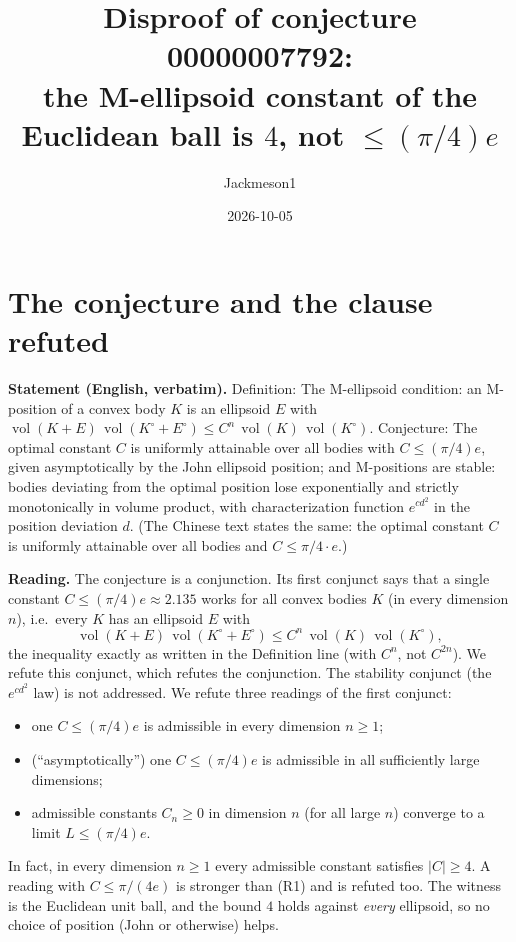 \documentclass[11pt]{article}
\title{Disproof of conjecture 00000007792:\\ the M-ellipsoid constant of the Euclidean ball is $4$, not $\le (\pi/4)e$}
\author{Jackmeson1}
\date{2026-10-05}
\theoremstyle{definition}
\newcommand{\vol}{\operatorname{vol}}
\begin{document}
\maketitle

\section{The conjecture and the clause refuted}

\textbf{Statement (English, verbatim).} Definition: The M-ellipsoid condition: an M-position of a
convex body $K$ is an ellipsoid $E$ with
$\vol(K+E)\,\vol(K^\circ+E^\circ)\le C^n\,\vol(K)\,\vol(K^\circ)$. Conjecture: The optimal constant
$C$ is uniformly attainable over all bodies with $C\le(\pi/4)e$, given asymptotically by the John
ellipsoid position; and M-positions are stable: bodies deviating from the optimal position lose
exponentially and strictly monotonically in volume product, with characterization function
$e^{c d^2}$ in the position deviation $d$. (The Chinese text states the same: the optimal constant
$C$ is uniformly attainable over all bodies and $C\le \pi/4\cdot e$.)

\textbf{Reading.} The conjecture is a conjunction. Its first conjunct says that a single constant
$C\le(\pi/4)e\approx 2.135$ works for all convex bodies $K$ (in every dimension $n$), i.e.\ every
$K$ has an ellipsoid $E$ with
\[
  \vol(K+E)\,\vol(K^\circ+E^\circ)\le C^n\,\vol(K)\,\vol(K^\circ),
\]
the inequality exactly as written in the Definition line (with $C^n$, not $C^{2n}$). We refute this
conjunct, which refutes the conjunction. The stability conjunct (the $e^{cd^2}$ law) is not
addressed. We refute three readings of the first conjunct:
\begin{itemize}
\item[(R1)] one $C\le(\pi/4)e$ is admissible in every dimension $n\ge 1$;
\item[(R2)] (``asymptotically'') one $C\le(\pi/4)e$ is admissible in all sufficiently large
  dimensions;
\item[(R3)] admissible constants $C_n\ge 0$ in dimension $n$ (for all large $n$) converge to a
  limit $L\le(\pi/4)e$.
\end{itemize}
In fact, in every dimension $n\ge1$ every admissible constant satisfies $|C|\ge 4$. A reading with
$C\le \pi/(4e)$ is stronger than (R1) and is refuted too. The witness is the Euclidean unit ball,
and the bound $4$ holds against \emph{every} ellipsoid,
so no choice of position (John or otherwise) helps.
\end{document}
